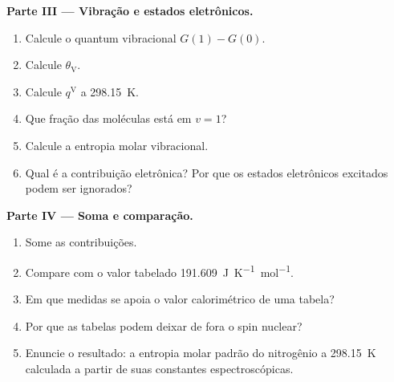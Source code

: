 \begin{problem}
\medskip\noindent\textbf{Parte III --- Vibração e estados eletrônicos.}
\begin{enumerate}[resume]
  \item Calcule o quantum vibracional $G(1) - G(0)$.
  \item Calcule $\theta_{\mathrm V}$.
  \item Calcule $q^{\mathrm V}$ a \qty{298.15}{K}.
  \item Que fração das moléculas está em $v = 1$?
  \item Calcule a entropia molar vibracional.
  \item Qual é a contribuição eletrônica? Por que os estados eletrônicos excitados
        podem ser ignorados?
\end{enumerate}

\medskip\noindent\textbf{Parte IV --- Soma e comparação.}
\begin{enumerate}[resume]
  \item Some as contribuições.
  \item Compare com o valor tabelado \qty{191.609}{J.K^{-1}.mol^{-1}}.
  \item Em que medidas se apoia o valor calorimétrico de uma tabela?
  \item Por que as tabelas podem deixar de fora o spin nuclear?
  \item Enuncie o resultado: a entropia molar padrão do nitrogênio a \qty{298.15}{K}
        calculada a partir de suas constantes espectroscópicas.
\end{enumerate}
\end{problem}
